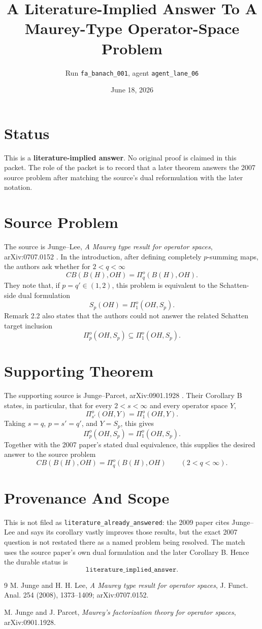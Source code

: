 \documentclass[11pt]{article}
\title{A Literature-Implied Answer To A Maurey-Type Operator-Space Problem}
\author{Run \texttt{fa\_banach\_001}, agent \texttt{agent\_lane\_06}}
\date{June 18, 2026}
\newcommand{\PiO}{\Pi^{o}}
\newcommand{\CB}{CB}
\newcommand{\OH}{OH}
\newcommand{\BH}{B(H)}
\begin{document}
\maketitle

\section*{Status}

This is a \textbf{literature-implied answer}.  No original proof is claimed in
this packet.  The role of the packet is to record that a later theorem answers
the 2007 source problem after matching the source's dual reformulation with
the later notation.

\section*{Source Problem}

The source is Junge--Lee, \emph{A Maurey type result for operator spaces},
arXiv:0707.0152 \cite{JHL}.  In the introduction, after defining completely
\(p\)-summing maps, the authors ask whether for \(2<q<\infty\)
\[
  \CB(\BH,\OH)=\PiO_q(\BH,\OH).
\]
They note that, if \(p=q'\in(1,2)\), this problem is equivalent to the
Schatten-side dual formulation
\[
  S_p(\OH)=\PiO_1(\OH,S_p).
\]
Remark 2.2 also states that the authors could not answer the related Schatten
target inclusion
\[
  \PiO_p(\OH,S_p)\subseteq \PiO_1(\OH,S_p).
\]

\section*{Supporting Theorem}

The supporting source is Junge--Parcet, arXiv:0901.1928 \cite{JP}.
Their Corollary B states, in particular, that for every \(2<s<\infty\)
and every operator space \(Y\),
\[
  \PiO_{s'}(\OH,Y)=\PiO_1(\OH,Y).
\]
Taking \(s=q\), \(p=s'=q'\), and \(Y=S_p\), this gives
\[
  \PiO_p(\OH,S_p)=\PiO_1(\OH,S_p).
\]
Together with the 2007 paper's stated dual equivalence, this supplies the
desired answer to the source problem
\[
  \CB(\BH,\OH)=\PiO_q(\BH,\OH)\qquad (2<q<\infty).
\]

\section*{Provenance And Scope}

This is not filed as \texttt{literature\_already\_answered}: the 2009 paper
cites Junge--Lee and says its corollary vastly improves those results, but the
exact 2007 question is not restated there as a named problem being resolved.
The match uses the source paper's own dual formulation and the later
Corollary B.  Hence the durable status is
\[
  \texttt{literature\_implied\_answer}.
\]

\begin{thebibliography}{9}
M. Junge and H. H. Lee,
\emph{A Maurey type result for operator spaces},
J. Funct. Anal. 254 (2008), 1373--1409;
arXiv:0707.0152.

M. Junge and J. Parcet,
\emph{Maurey's factorization theory for operator spaces},
arXiv:0901.1928.
\end{thebibliography}
\end{document}
